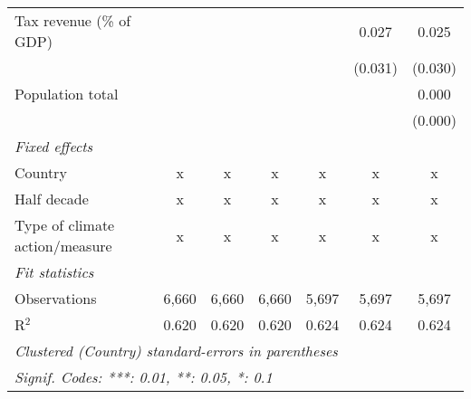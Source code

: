 \begin{tabular}{lcccccc}
   Tax revenue (\% of GDP)                                                        &               &               &               &         & 0.027   & 0.025\\   
                                                                                  &               &               &               &         & (0.031) & (0.030)\\   
   Population total                                                               &               &               &               &         &         & 0.000\\   
                                                                                  &               &               &               &         &         & (0.000)\\   
   \emph{Fixed effects}\\
   Country                                                                        & x             & x             & x             & x       & x       & x\\  
   Half decade                                                                    & x             & x             & x             & x       & x       & x\\  
   Type of climate action/measure                                                 & x             & x             & x             & x       & x       & x\\  
   \midrule \emph{Fit statistics}\\
   Observations                                                                   & 6,660         & 6,660         & 6,660         & 5,697   & 5,697   & 5,697\\  
   R$^2$                                                                          & 0.620         & 0.620         & 0.620         & 0.624   & 0.624   & 0.624\\  
   \midrule
   \multicolumn{7}{l}{\emph{Clustered (Country) standard-errors in parentheses}}\\
   \multicolumn{7}{l}{\emph{Signif. Codes: ***: 0.01, **: 0.05, *: 0.1}}\\
\end{tabular}
\par\endgroup



